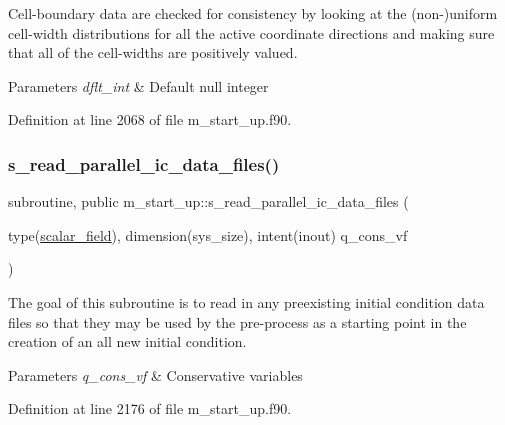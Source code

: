 Cell-\/boundary data are checked for consistency by looking at the (non-\/)uniform cell-\/width distributions for all the active coordinate directions and making sure that all of the cell-\/widths are positively valued. 


\begin{DoxyParams}{Parameters}
{\em dflt\+\_\+int} & Default null integer \\
\hline
\end{DoxyParams}


Definition at line 2068 of file m\+\_\+start\+\_\+up.\+f90.

\mbox{\label{namespacem__start__up_a25daee88d75c57908efa6e3e0516fb28}} 
\subsubsection{\texorpdfstring{s\+\_\+read\+\_\+parallel\+\_\+ic\+\_\+data\+\_\+files()}{s\_read\_parallel\_ic\_data\_files()}}
{\footnotesize\ttfamily subroutine, public m\+\_\+start\+\_\+up\+::s\+\_\+read\+\_\+parallel\+\_\+ic\+\_\+data\+\_\+files (\begin{DoxyParamCaption}\item[{type(\hyperlink{structm__derived__types_1_1scalar__field}{scalar\+\_\+field}), dimension(sys\+\_\+size), intent(inout)}]{q\+\_\+cons\+\_\+vf }\end{DoxyParamCaption})}



The goal of this subroutine is to read in any preexisting initial condition data files so that they may be used by the pre-\/process as a starting point in the creation of an all new initial condition. 


\begin{DoxyParams}{Parameters}
{\em q\+\_\+cons\+\_\+vf} & Conservative variables \\
\hline
\end{DoxyParams}


Definition at line 2176 of file m\+\_\+start\+\_\+up.\+f90.

\mbox{\label{namespacem__start__up_ac2be28e53607458a3860b03446ed6497}} 
